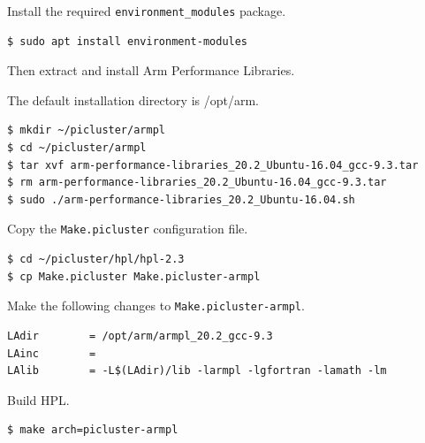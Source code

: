 \documentclass{report}
\begin{document}
Install the required \verb|environment_modules| package.

\lstset{style=type}
\begin{lstlisting}
$ sudo apt install environment-modules
\end{lstlisting}

Then extract and install Arm Performance Libraries.

The default installation directory is /opt/arm.

\lstset{style=type}
\begin{lstlisting}
$ mkdir ~/picluster/armpl
$ cd ~/picluster/armpl
$ tar xvf arm-performance-libraries_20.2_Ubuntu-16.04_gcc-9.3.tar
$ rm arm-performance-libraries_20.2_Ubuntu-16.04_gcc-9.3.tar
$ sudo ./arm-performance-libraries_20.2_Ubuntu-16.04.sh
\end{lstlisting}

Copy the \verb|Make.picluster| configuration file.

\lstset{style=type}
\begin{lstlisting}
$ cd ~/picluster/hpl/hpl-2.3
$ cp Make.picluster Make.picluster-armpl
\end{lstlisting}

Make the following changes to \verb|Make.picluster-armpl|.

\lstset{style=listing}
\begin{lstlisting}[caption=Make.picluster-armpl, numbers=none]
LAdir        = /opt/arm/armpl_20.2_gcc-9.3
LAinc        =
LAlib        = -L$(LAdir)/lib -larmpl -lgfortran -lamath -lm
\end{lstlisting}

Build HPL.

\lstset{style=type}
\begin{lstlisting}
$ make arch=picluster-armpl
\end{lstlisting}


%
%
\end{document}
